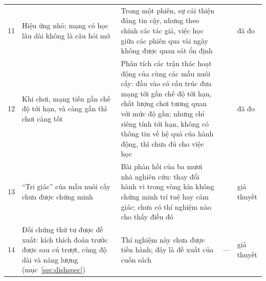 {\begin{longtable}{>{\raggedright}p{0.5cm}>{\raggedright}p{4.0cm}>{\raggedright}p{5.6cm}>{\raggedright}p{2.3cm}>{\raggedright\arraybackslash}p{1.7cm}}
11 & Hiệu ứng nhỏ; mạng có học lâu dài không là câu hỏi mở & Trong một phiên, sự cải thiện đáng tin cậy, nhưng theo chính các tác giả, việc học giữa các phiên qua vài ngày không được quan sát ổn định & \cite{Kagan2022} & đã đo \\
12 & Khi chơi, mạng tiến gần chế độ tới hạn, và càng gần thì chơi càng tốt & Phân tích các trận thác hoạt động của cùng các mẫu nuôi cấy: đầu vào có cấu trúc đưa mạng tới gần chế độ tới hạn, chất lượng chơi tương quan với mức độ gần; nhưng chỉ riêng tính tới hạn, không có thông tin về hệ quả của hành động, thì chưa đủ cho việc học & \cite{Habibollahi2023} & đã đo \\
13 & ``Tri giác'' của mẫu nuôi cấy chưa được chứng minh & Bài phản hồi của ba mươi nhà nghiên cứu: thay đổi hành vi trong vòng kín không chứng minh trí tuệ hay cảm giác; chưa có thí nghiệm nào cho thấy điều đó & \cite{Balci2023} & giả thuyết \\
14 & Đối chứng thứ tư được đề xuất: kích thích đoán trước được sau cú trượt, cùng độ dài và năng lượng (mục~\ref{sec:dishspec}) & Thí nghiệm này chưa được tiến hành; đây là đề xuất của cuốn sách & --- & giả thuyết \\
\bottomrule
\end{longtable}}

